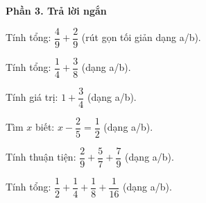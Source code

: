 \textbf{Phần 3. Trả lời ngắn}

\begin{ex} %
Tính tổng: $\dfrac{4}{9} + \dfrac{2}{9}$ (rút gọn tối giản dạng a/b).
\end{ex}

\begin{ex} %
Tính tổng: $\dfrac{1}{4} + \dfrac{3}{8}$ (dạng a/b).
\end{ex}

\begin{ex} %
Tính giá trị: $1 + \dfrac{3}{4}$ (dạng a/b).
\end{ex}

\begin{ex} %
Tìm $x$ biết: $x - \dfrac{2}{5} = \dfrac{1}{2}$ (dạng a/b).
\end{ex}

\begin{ex} %
Tính thuận tiện: $\dfrac{2}{9} + \dfrac{5}{7} + \dfrac{7}{9}$ (dạng a/b).
\end{ex}

\begin{ex} %
Tính tổng: $\dfrac{1}{2} + \dfrac{1}{4} + \dfrac{1}{8} + \dfrac{1}{16}$ (dạng a/b).
\end{ex}
